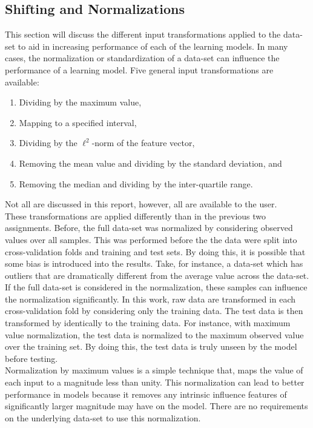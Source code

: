 \documentclass[paper=a4, fontsize=11pt]{scrartcl} %
\begin{document}
\subsection*{Shifting and Normalizations}
This section will discuss the different input transformations applied to the data-set to aid in increasing performance of each of the learning models.
In many cases, the normalization or standardization of a data-set can influence the performance of a learning model.
Five general input transformations are available: 
\begin{enumerate}
	\item Dividing by the maximum value, 
	\item Mapping to a specified interval, 
	\item Dividing by the $\ell^2$-norm of the feature vector, 
	\item Removing the mean value and dividing by the standard deviation, and 
	\item Removing the median and dividing by the inter-quartile range.
\end{enumerate}
Not all are discussed in this report, however, all are available to the user.
\\
These transformations are applied differently than in the previous two assignments.
Before, the full data-set was normalized by considering observed values over all samples.
This was performed before the the data were split into cross-validation folds and training and test sets.
By doing this, it is possible that some bias is introduced into the results.
Take, for instance, a data-set which has outliers that are dramatically different from the average value across the data-set.
If the full data-set is considered in the normalization, these samples can influence the normalization significantly.
In this work, raw data are transformed in each cross-validation fold by considering only the training data.
The test data is then transformed by identically to the training data.
For instance, with maximum value normalization, the test data is normalized to the maximum observed value over the training set.
By doing this, the test data is truly unseen by the model before testing.
\\
Normalization by maximum values is a simple technique that, maps the value of each input to a magnitude less than unity.
This normalization can lead to better performance in models because it removes any intrinsic influence features of significantly larger magnitude may have on the model.
There are no requirements on the underlying data-set to use this normalization.
\end{document}
